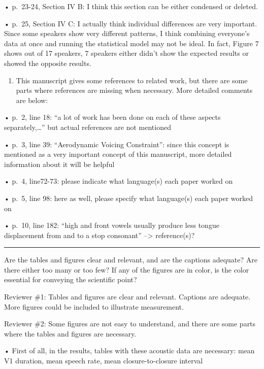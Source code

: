 \documentclass[]{article}
\providecommand{\tightlist}{%
  \setlength{\itemsep}{0pt}\setlength{\parskip}{0pt}}
\begin{document}
• p.~23-24, Section IV B: I think this section can be either condensed
or deleted.

• p.~25, Section IV C: I actually think individual differences are very
important. Since some speakers show very different patterns, I think
combining everyone's data at once and running the statistical model may
not be ideal. In fact, Figure 7 shows out of 17 speakers, 7 speakers
either didn't show the expected results or showed the opposite results.

\begin{enumerate}
\def\labelenumi{\arabic{enumi}.}
\setcounter{enumi}{1}
\tightlist
\item
  This manuscript gives some references to related work, but there are
  some parts where references are missing when necessary. More detailed
  comments are below:
\end{enumerate}

• p.~2, line 18: ``a lot of work has been done on each of these aspects
separately,\ldots{}'' but actual references are not mentioned

• p.~3, line 39: ``Aerodynamic Voicing Constraint'': since this concept
is mentioned as a very important concept of this manuscript, more
detailed information about it will be helpful

• p.~4, line72-73: please indicate what language(s) each paper worked on

• p.~5, line 98: here as well, please specify what language(s) each
paper worked on

• p.~10, line 182: ``high and front vowels usually produce less tongue
displacement from and to a stop consonant'' --\textgreater{}
reference(s)?

\begin{center}\rule{0.5\linewidth}{\linethickness}\end{center}

Are the tables and figures clear and relevant, and are the captions
adequate? Are there either too many or too few? If any of the figures
are in color, is the color essential for conveying the scientific point?

Reviewer \#1: Tables and figures are clear and relevant. Captions are
adequate. More figures could be included to illustrate measurement.

Reviewer \#2: Some figures are not easy to understand, and there are
some parts where the tables and figures are necessary.

• First of all, in the results, tables with these acoustic data are
necessary: mean V1 duration, mean speech rate, mean closure-to-closure
interval
\end{document}
